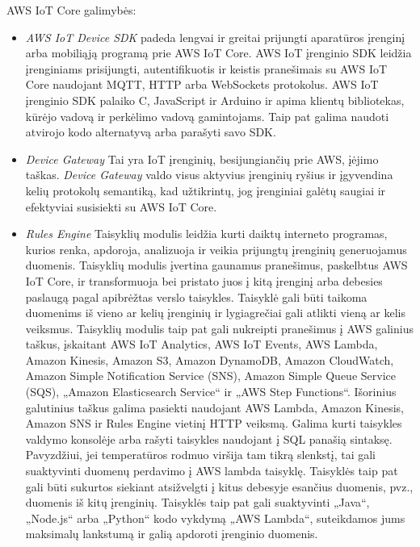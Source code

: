 \documentclass{VUMIFInfBakalaurinis}
\begin{document}
AWS IoT Core galimybės:
\begin{itemize}
\item \emph{AWS IoT Device SDK} padeda lengvai ir greitai prijungti aparatūros įrenginį arba mobiliąją programą prie AWS IoT Core.
AWS IoT įrenginio SDK leidžia įrenginiams prisijungti, autentifikuotis ir keistis pranešimais su AWS IoT Core naudojant MQTT, HTTP arba WebSockets protokolus.
AWS IoT įrenginio SDK palaiko C, JavaScript ir Arduino ir apima klientų bibliotekas, kūrėjo vadovą ir perkėlimo vadovą gamintojams.
Taip pat galima naudoti atvirojo kodo alternatyvą arba parašyti savo SDK.

\item \emph{Device Gateway}
Tai yra IoT įrenginių, besijungiančių prie AWS, įėjimo taškas.
\emph{Device Gateway} valdo visus aktyvius įrenginių ryšius ir įgyvendina kelių protokolų semantiką, kad užtikrintų, jog įrenginiai galėtų saugiai ir efektyviai susisiekti su AWS IoT Core.

\item \emph{Rules Engine}
Taisyklių modulis leidžia kurti daiktų interneto programas, kurios renka, apdoroja, analizuoja ir veikia prijungtų įrenginių generuojamus duomenis.
Taisyklių modulis įvertina gaunamus pranešimus, paskelbtus AWS IoT Core, ir transformuoja bei pristato juos į kitą įrenginį arba debesies paslaugą pagal apibrėžtas verslo taisykles.
Taisyklė gali būti taikoma duomenims iš vieno ar kelių įrenginių ir lygiagrečiai gali atlikti vieną ar kelis veiksmus.
Taisyklių modulis taip pat gali nukreipti pranešimus į AWS galinius taškus, įskaitant AWS IoT Analytics, AWS IoT Events, AWS Lambda, Amazon Kinesis, Amazon S3, Amazon DynamoDB, Amazon CloudWatch,
Amazon Simple Notification Service (SNS), Amazon Simple Queue Service (SQS), „Amazon Elasticsearch Service“ ir „AWS Step Functions“.
Išorinius galutinius taškus galima pasiekti naudojant AWS Lambda, Amazon Kinesis, Amazon SNS ir Rules Engine vietinį HTTP veiksmą.
Galima kurti taisykles valdymo konsolėje arba rašyti taisykles naudojant į SQL panašią sintaksę.
Pavyzdžiui, jei temperatūros rodmuo viršija tam tikrą slenkstį, tai gali suaktyvinti duomenų perdavimo į AWS lambda taisyklę.
Taisyklės taip pat gali būti sukurtos siekiant atsižvelgti į kitus debesyje esančius duomenis, pvz., duomenis iš kitų įrenginių.
Taisyklės taip pat gali suaktyvinti „Java“, „Node.js“ arba „Python“ kodo vykdymą „AWS Lambda“, suteikdamos jums maksimalų lankstumą ir galią apdoroti įrenginio duomenis.
\end{itemize}
\end{document}
